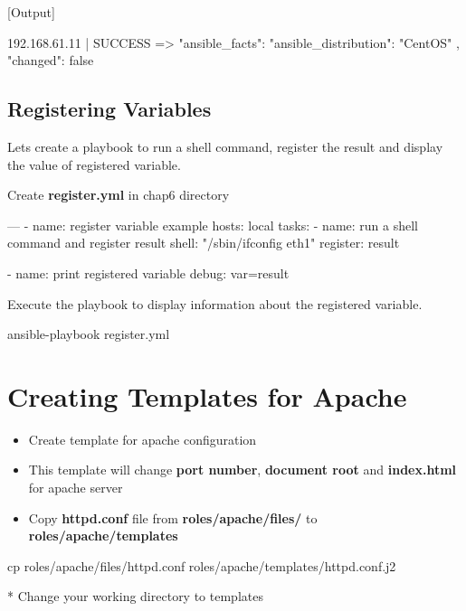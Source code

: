 [Output]  

\begin{code}
192.168.61.11 | SUCCESS => {
  "ansible_facts": {
      "ansible_distribution": "CentOS"
  },
  "changed": false
}  
\end{code}

\subsection{Registering  Variables}

Lets create a playbook to run a shell command, register the result and display the value of registered variable.

Create \textbf{register.yml} in chap6 directory
\begin{code}
---
  - name: register variable example
    hosts: local
    tasks:
      - name: run a shell command and register result
        shell: "/sbin/ifconfig eth1"
        register: result

      - name: print registered variable
        debug: var=result
\end{code}

Execute the playbook to display information about the registered variable.
\begin{code}
ansible-playbook  register.yml

\end{code}

\section{Creating Templates for Apache}

\begin{itemize}
\item Create template for apache configuration    
\item This template will change \textbf{port number}, \textbf{document root} and \textbf{index.html} for  apache server    
\item Copy \textbf{httpd.conf} file from \textbf{roles/apache/files/} to \textbf{roles/apache/templates}
\end{itemize}

\begin{code}
    cp roles/apache/files/httpd.conf roles/apache/templates/httpd.conf.j2

\end{code}
  * Change your working directory to templates  

